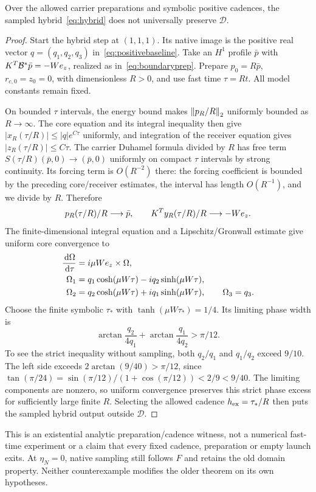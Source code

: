 \begin{proposition}\label{prop:domainhybrid}
Over the allowed carrier preparations and symbolic positive cadences, the sampled hybrid~\eqref{eq:hybrid} does not universally preserve $\mathcal D$.
\end{proposition}
\begin{proof}
Start the hybrid step at $(1,1,1)$. Its native image is the positive real vector $q=(q_1,q_2,q_3)$ in~\eqref{eq:positivebaseline}. Take an $H^1$ profile $\bar p$ with $K^T\mathcal B^*\bar p=-We_z$, realized as in~\eqref{eq:boundaryprep}. Prepare $p_0=R\bar p$, $r_{c,0}=z_0=0$, with dimensionless $R>0$, and use fast time $\tau=Rt$. All model constants remain fixed.

On bounded $\tau$ intervals, the energy bound makes $\left\|p_R/R\right\|_2$ uniformly bounded as $R\to\infty$. The core equation and its integral inequality then give $|x_R(\tau/R)|\le|q|e^{C\tau}$ uniformly, and integration of the receiver equation gives $|z_R(\tau/R)|\le C\tau$. The carrier Duhamel formula divided by $R$ has free term $S(\tau/R)(\bar p,0)\to(\bar p,0)$ uniformly on compact $\tau$ intervals by strong continuity. Its forcing term is $O(R^{-2})$ there: the forcing coefficient is bounded by the preceding core/receiver estimates, the interval has length $O(R^{-1})$, and we divide by $R$. Therefore
\begin{equation}\label{eq:fastports}
 p_R(\tau/R)/R\longrightarrow\bar p,\qquad
 K^Ty_R(\tau/R)/R\longrightarrow-We_z.
\end{equation}
The finite-dimensional integral equation and a Lipschitz/Gronwall estimate give uniform core convergence to
\begin{equation}\label{eq:fastcore}
\begin{aligned}
 \frac{\,\mathrm d\Omega}{\,\mathrm d\tau}&=i\mu We_z\times\Omega,\\
 \Omega_1&=q_1\cosh(\mu W\tau)-i q_2\sinh(\mu W\tau),\\
 \Omega_2&=q_2\cosh(\mu W\tau)+i q_1\sinh(\mu W\tau),\qquad
 \Omega_3=q_3.
\end{aligned}
\end{equation}
Choose the finite symbolic $\tau_*$ with $\tanh(\mu W\tau_*)=1/4$. Its limiting phase width is
\begin{equation}\label{eq:fastspan}
 \arctan\frac{q_2}{4q_1}+\arctan\frac{q_1}{4q_2}>\pi/12.
\end{equation}
To see the strict inequality without sampling, both $q_2/q_1$ and $q_1/q_2$ exceed $9/10$. The left side exceeds $2\arctan(9/40)>\pi/12$, since
$\tan(\pi/24)=\sin(\pi/12)/(1+\cos(\pi/12))<2/9<9/40$.
The limiting components are nonzero, so uniform convergence preserves this strict phase excess for sufficiently large finite $R$. Selecting the allowed cadence $h_{\rm ex}=\tau_*/R$ then puts the sampled hybrid output outside $\mathcal D$.
\end{proof}
This is an existential analytic preparation/cadence witness, not a numerical fast-time experiment or a claim that every fixed cadence, preparation or empty launch exits. At $\eta_N=0$, native sampling still follows $F$ and retains the old domain property. Neither counterexample modifies the older theorem on its own hypotheses.
